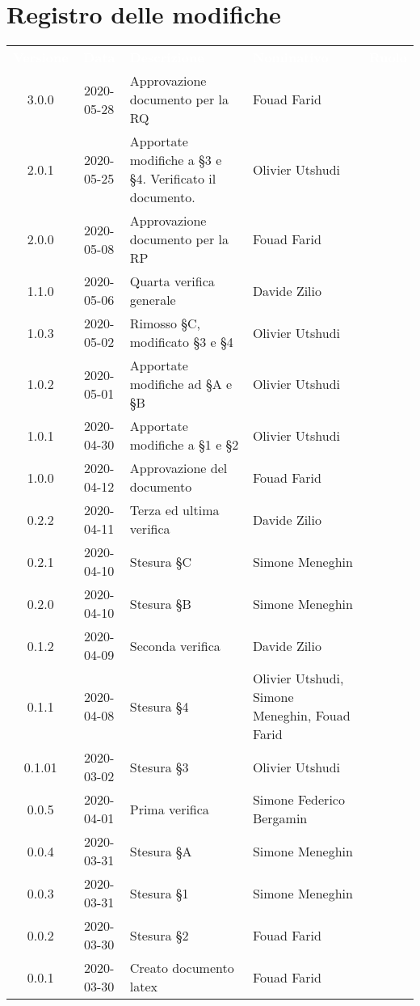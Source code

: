 \section*{Registro delle modifiche}
{
	\centering
	\begin{longtable}{ c c  C{4cm}  C{3.5cm}  C{3.5cm} }
		\textcolor{white}{\textbf{Versione}} & \textcolor{white}{\textbf{Data}} & \textcolor{white}{\textbf{Descrizione}} & \textcolor{white}{\textbf{Nominativo}} & \textcolor{white}{\textbf{Ruolo}}\\	
		3.0.0 & 2020-05-28 & Approvazione documento per la RQ & Fouad Farid &\RdP \\		
		2.0.1 & 2020-05-25 & Apportate modifiche a §3 e §4. Verificato il documento.& Olivier Utshudi & \prog \\
		2.0.0 & 2020-05-08 & Approvazione documento per la RP & Fouad Farid &\RdP \\
		1.1.0 & 2020-05-06 & Quarta verifica generale & Davide Zilio & \ver{}\\
		1.0.3 & 2020-05-02 & Rimosso §C, modificato \S 3 e \S 4 & Olivier Utshudi &\prog \\		
		1.0.2 & 2020-05-01 & Apportate modifiche ad §A e §B & Olivier Utshudi &\prog \\
		1.0.1 & 2020-04-30 & Apportate modifiche a §1 e §2 & Olivier Utshudi &\prog \\
		1.0.0 & 2020-04-12 & Approvazione del documento & Fouad Farid &\RdP{} \\
		0.2.2 & 2020-04-11 & Terza ed ultima verifica & Davide Zilio &\ver{} \\
		0.2.1 & 2020-04-10 & Stesura \S C & Simone Meneghin &\prog{} \\
		0.2.0 & 2020-04-10 & Stesura \S B & Simone Meneghin &\prog{} \\
		0.1.2 & 2020-04-09 & Seconda verifica & Davide Zilio &\ver{} \\
		0.1.1 & 2020-04-08 & Stesura \S 4 & Olivier Utshudi, Simone Meneghin, Fouad Farid &\prog{} \\
		0.1.01 & 2020-03-02 & Stesura \S 3 & Olivier Utshudi &\prog{} \\
		0.0.5 & 2020-04-01 & Prima verifica & Simone Federico Bergamin &\ver{} \\
		0.0.4 & 2020-03-31 & Stesura \S A & Simone Meneghin &\prog{} \\
		0.0.3 & 2020-03-31 & Stesura \S 1 & Simone Meneghin &\prog{} \\
		0.0.2 & 2020-03-30 & Stesura \S 2 & Fouad Farid &\prog{} \\
		0.0.1 & 2020-03-30 & Creato documento latex & Fouad Farid &\prog{}\\		
		
	\end{longtable}

}